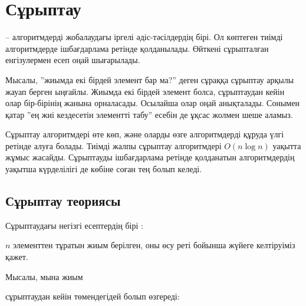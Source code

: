 \chapter{Сұрыптау}


 --
алгоритмдерді жобалаудағы іргелі әдіс-тәсілдердің бірі.
Ол көптеген тиімді алгоритмдерде ішбағдарлама ретінде қолданылады. Өйткені сұрыпталған енгізулермен есеп оңай шығарылады.

Мысалы, ''жиымда екі бірдей элемент бар ма?'' деген сұраққа
сұрыптау арқылы жауап берген ыңғайлы. Жиымда екі бірдей элемент болса, сұрыптаудан кейін олар бір-бірінің жанына орналасады.
Осылайша олар оңай анықталады.
Сонымен қатар ''ең жиі кездесетін элементті табу'' есебін де ұқсас жолмен шеше аламыз.

Сұрыптау алгоритмдері өте көп, және оларды өзге алгоритмдерді құруда үлгі ретінде алуға болады.
Тиімді жалпы сұрыптау алгоритмдері
$O(n \log n)$ уақытта жұмыс жасайды.
Сұрыптауды ішбағдарлама ретінде қолданатын алгоритмдердің уақытша күрделілігі де көбіне соған тең болып келеді.

\section{Сұрыптау теориясы}

Сұрыптаудағы негізгі есептердің бірі :
\begin{framed}
\noindent
$n$ элементтен тұратын жиым берілген,
оны өсу реті бойынша жүйеге келтіруіміз қажет.
\end{framed}
\noindent
Мысалы, мына жиым
\begin{center}
\end{center}
сұрыптаудан кейін төмендегідей болып өзгереді:
\begin{center}
\end{center}

